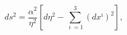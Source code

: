 \begin{equation}
ds^{2}=\frac{\alpha^{2}}{\eta^{2}}
[d\eta^{2}-\sum_{\imath=1}^{3}(dx^{\imath})^{2}],
\end{equation}


